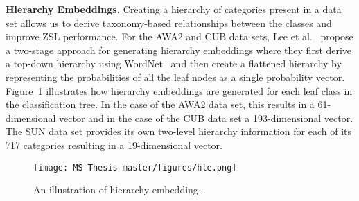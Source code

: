 \par
\medskip

\textbf{Hierarchy Embeddings.} Creating a hierarchy of categories present in a data set allows us to derive taxonomy-based relationships between the classes and improve ZSL performance. For the AWA2 and CUB data sets, Lee et al.~\cite{hnd} propose a two-stage approach for generating hierarchy embeddings where they first derive a top-down hierarchy using WordNet~\cite{wordnet} and then create a flattened hierarchy by representing the probabilities of all the leaf nodes as a single probability vector. Figure~\ref{image:hle} illustrates how hierarchy embeddings are generated for each leaf class in the classification tree. In the case of the AWA2 data set, this results in a 61-dimensional vector and in the case of the CUB data set a 193-dimensional vector. The SUN data set provides its own two-level hierarchy information for each of its 717 categories resulting in a 19-dimensional vector.

\par
\medskip

\begin{figure}[h!]
\texttt{[image: MS-Thesis-master/figures/hle.png]}
\caption{An illustration of hierarchy embedding~\cite{ale}.}
\label{image:hle}
\end{figure}

